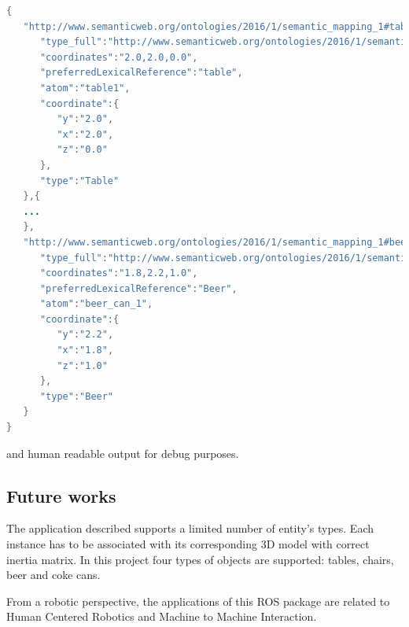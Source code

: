 \begin{lstlisting}[language=Java]
{
   "http://www.semanticweb.org/ontologies/2016/1/semantic_mapping_1#table1":{
      "type_full":"http://www.semanticweb.org/ontologies/2016/1/semantic_mapping_domain_model#Table",
      "coordinates":"2.0,2.0,0.0",
      "preferredLexicalReference":"table",
      "atom":"table1",
      "coordinate":{
         "y":"2.0",
         "x":"2.0",
         "z":"0.0"
      },
      "type":"Table"
   },{
   ...
   },
   "http://www.semanticweb.org/ontologies/2016/1/semantic_mapping_1#beer_can_1":{
      "type_full":"http://www.semanticweb.org/ontologies/2016/1/semantic_mapping_domain_model#Beer",
      "coordinates":"1.8,2.2,1.0",
      "preferredLexicalReference":"Beer",
      "atom":"beer_can_1",
      "coordinate":{
         "y":"2.2",
         "x":"1.8",
         "z":"1.0"
      },
      "type":"Beer"
   }
}
\end{lstlisting}


and human readable output for debug purposes.  




\subsection{Future works}

The application described supports a limited number of entity's types. Each instance has to be associated with its corresponding 3D model with correct inertia matrix. In this project four types of objects are supported: tables, chairs, beer and coke cans.

From a robotic perspective, the applications of this ROS package are related to Human Centered Robotics and Machine to Machine Interaction.

